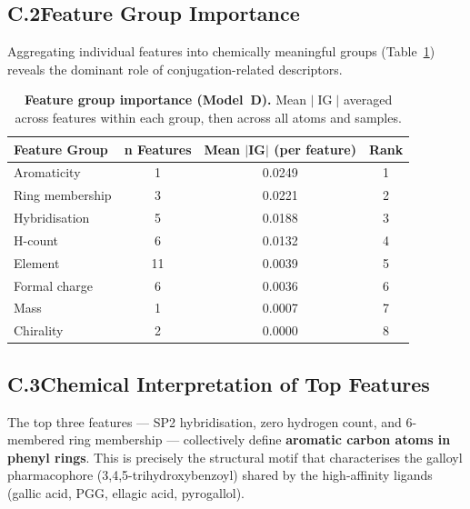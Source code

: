 \documentclass[11pt]{article}
\begin{document}
\subsection*{C.2\quad Feature Group Importance}

Aggregating individual features into chemically meaningful groups
(Table~\ref{tab:app_shap_groups}) reveals the dominant role of
conjugation-related descriptors.

\begin{table}[H]
\small
\centering
\caption{\textbf{Feature group importance (Model~D).}
  Mean $|\operatorname{IG}|$ averaged across features within each group,
  then across all atoms and samples.}
\label{tab:app_shap_groups}
\begin{tabular}{lccc}
\toprule
\textbf{Feature Group} & \textbf{n Features}
  & \textbf{Mean $|$IG$|$ (per feature)} & \textbf{Rank} \\
\midrule
Aromaticity     &  1 & 0.0249 & 1 \\
Ring membership &  3 & 0.0221 & 2 \\
Hybridisation   &  5 & 0.0188 & 3 \\
H-count         &  6 & 0.0132 & 4 \\
Element         & 11 & 0.0039 & 5 \\
Formal charge   &  6 & 0.0036 & 6 \\
Mass            &  1 & 0.0007 & 7 \\
Chirality       &  2 & 0.0000 & 8 \\
\bottomrule
\end{tabular}
\end{table}

\subsection*{C.3\quad Chemical Interpretation of Top Features}

The top three features --- SP2 hybridisation, zero hydrogen count, and
6-membered ring membership --- collectively define
\textbf{aromatic carbon atoms in phenyl rings}.
This is precisely the structural motif that characterises the galloyl
pharmacophore (3,4,5-trihydroxybenzoyl) shared by the high-affinity
ligands (gallic acid, PGG, ellagic acid, pyrogallol).
\end{document}
